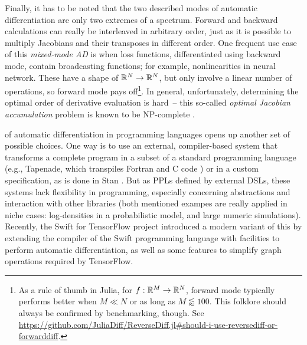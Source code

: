 Finally, it has to be noted that the two described modes of automatic differentiation are only two
extremes of a spectrum.  Forward and backward calculations can really be interleaved in arbitrary
order, just as it is possible to multiply Jacobians and their transposes in different order.  One
frequent use case of this \emph{mixed-mode AD} is when loss functions, differentiated using backward
mode, contain broadcasting functions; for example, nonlinearities in neural network.  These have a
shape of \(\mathbb{R}^N \to \mathbb{R}^N\), but only involve a linear number of operations, so forward mode pays
off\footnote{As a rule of thumb in Julia, for \(f: \mathbb{R}^M \to \mathbb{R}^N\), forward mode typically
  performs better when \(M \ll N\) or as long as \(M \lessapprox 100\).  This folklore should always
  be confirmed by benchmarking, though.  See
  \url{https://github.com/JuliaDiff/ReverseDiff.jl\#should-i-use-reversediff-or-forwarddiff}.}.  In
general, unfortunately, determining the optimal order of derivative evaluation is hard~-- this
so-called \emph{optimal Jacobian accumulation} problem is known to be NP-complete
\parencite{naumann2007optimal}.

 of automatic differentiation in programming languages
opens up another set of possible choices.  One way is to use an external, compiler-based system that
transforms a complete program in a subset of a standard programming language (e.g., Tapenade, which
transpiles Fortran and C code \parencite{tapenadedevelopers2019tapenade}) or in a custom
specification, as is done in Stan \parencite{carpenter2015stan}.  But as PPLs defined by external
DSLs, these systems lack flexibility in programming, especially concerning abstractions and
interaction with other libraries (both mentioned exampes are really applied in niche cases:
log-densities in a probabilistic model, and large numeric simulations).  Recently, the Swift for
TensorFlow project \parencite{tensorflowdevelopers2018swift,hong2018graph} introduced a modern
variant of this by extending the compiler of the Swift programming language with facilities to
perform automatic differentiation, as well as some features to simplify graph operations required by
TensorFlow.

